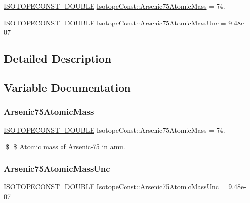 \begin{DoxyCompactItemize}
\item 
\mbox{\hyperlink{group___isotope_const-_macros_ga8f45a7272ce02c0b4c65c44636ed719a}{I\+S\+O\+T\+O\+P\+E\+C\+O\+N\+S\+T\+\_\+\+D\+O\+U\+B\+LE}} \mbox{\hyperlink{group___isotope_const-_arsenic-_as75_gaf090d6b12c799d42e089cda9cdaf347d}{Isotope\+Const\+::\+Arsenic75\+Atomic\+Mass}} = 74.
\item 
\mbox{\hyperlink{group___isotope_const-_macros_ga8f45a7272ce02c0b4c65c44636ed719a}{I\+S\+O\+T\+O\+P\+E\+C\+O\+N\+S\+T\+\_\+\+D\+O\+U\+B\+LE}} \mbox{\hyperlink{group___isotope_const-_arsenic-_as75_ga908d62796a2e113ee4b33a2098ca79d8}{Isotope\+Const\+::\+Arsenic75\+Atomic\+Mass\+Unc}} = 9.\+48e-\/07
\end{DoxyCompactItemize}


\subsection{Detailed Description}


\subsection{Variable Documentation}
\mbox{\label{group___isotope_const-_arsenic-_as75_gaf090d6b12c799d42e089cda9cdaf347d}} 
\subsubsection{\texorpdfstring{Arsenic75\+Atomic\+Mass}{Arsenic75AtomicMass}}
{\footnotesize\ttfamily \mbox{\hyperlink{group___isotope_const-_macros_ga8f45a7272ce02c0b4c65c44636ed719a}{I\+S\+O\+T\+O\+P\+E\+C\+O\+N\+S\+T\+\_\+\+D\+O\+U\+B\+LE}} Isotope\+Const\+::\+Arsenic75\+Atomic\+Mass = 74.}

\$ \$ Atomic mass of Arsenic-\/75 in amu. \mbox{\label{group___isotope_const-_arsenic-_as75_ga908d62796a2e113ee4b33a2098ca79d8}} 
\subsubsection{\texorpdfstring{Arsenic75\+Atomic\+Mass\+Unc}{Arsenic75AtomicMassUnc}}
{\footnotesize\ttfamily \mbox{\hyperlink{group___isotope_const-_macros_ga8f45a7272ce02c0b4c65c44636ed719a}{I\+S\+O\+T\+O\+P\+E\+C\+O\+N\+S\+T\+\_\+\+D\+O\+U\+B\+LE}} Isotope\+Const\+::\+Arsenic75\+Atomic\+Mass\+Unc = 9.\+48e-\/07}

